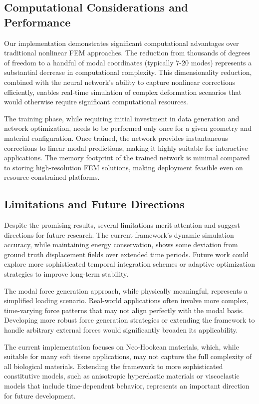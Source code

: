 \documentclass[11pt,a4paper]{article}
\numberwithin{equation}{section}
\begin{document}
\subsection{Computational Considerations and Performance}
Our implementation demonstrates significant computational advantages over traditional nonlinear FEM approaches. The reduction from thousands of degrees of freedom to a handful of modal coordinates (typically 7-20 modes) represents a substantial decrease in computational complexity. This dimensionality reduction, combined with the neural network's ability to capture nonlinear corrections efficiently, enables real-time simulation of complex deformation scenarios that would otherwise require significant computational resources.

The training phase, while requiring initial investment in data generation and network optimization, needs to be performed only once for a given geometry and material configuration. Once trained, the network provides instantaneous corrections to linear modal predictions, making it highly suitable for interactive applications. The memory footprint of the trained network is minimal compared to storing high-resolution FEM solutions, making deployment feasible even on resource-constrained platforms.

\subsection{Limitations and Future Directions}
Despite the promising results, several limitations merit attention and suggest directions for future research. The current framework's dynamic simulation accuracy, while maintaining energy conservation, shows some deviation from ground truth displacement fields over extended time periods. Future work could explore more sophisticated temporal integration schemes or adaptive optimization strategies to improve long-term stability.

The modal force generation approach, while physically meaningful, represents a simplified loading scenario. Real-world applications often involve more complex, time-varying force patterns that may not align perfectly with the modal basis. Developing more robust force generation strategies or extending the framework to handle arbitrary external forces would significantly broaden its applicability.

The current implementation focuses on Neo-Hookean materials, which, while suitable for many soft tissue applications, may not capture the full complexity of all biological materials. Extending the framework to more sophisticated constitutive models, such as anisotropic hyperelastic materials or viscoelastic models that include time-dependent behavior, represents an important direction for future development.
\end{document}

